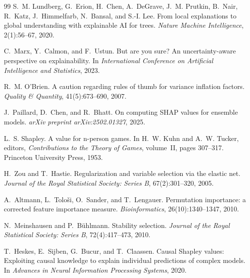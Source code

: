 \documentclass[11pt]{article}
\begin{document}
\begin{thebibliography}{99}
S.~M. Lundberg, G.~Erion, H.~Chen, A.~DeGrave, J.~M. Prutkin, B.~Nair,
  R.~Katz, J.~Himmelfarb, N.~Bansal, and S.-I. Lee.
\newblock From local explanations to global understanding with explainable {AI}
  for trees.
\newblock \emph{Nature Machine Intelligence}, 2(1):56--67, 2020.

C.~Marx, Y.~Calmon, and F.~Ustun.
\newblock But are you sure? An uncertainty-aware perspective on explainability.
\newblock In \emph{International Conference on Artificial Intelligence and
  Statistics}, 2023.

R.~M. O'Brien.
\newblock A caution regarding rules of thumb for variance inflation factors.
\newblock \emph{Quality \& Quantity}, 41(5):673--690, 2007.

J.~Paillard, D.~Chen, and R.~Bhatt.
\newblock On computing {SHAP} values for ensemble models.
\newblock \emph{arXiv preprint arXiv:2502.01327}, 2025.

L.~S. Shapley.
\newblock A value for n-person games.
\newblock In H.~W. Kuhn and A.~W. Tucker, editors, \emph{Contributions to the
  Theory of Games}, volume~II, pages 307--317. Princeton University Press, 1953.

H.~Zou and T.~Hastie.
\newblock Regularization and variable selection via the elastic net.
\newblock \emph{Journal of the Royal Statistical Society: Series B},
  67(2):301--320, 2005.

A.~Altmann, L.~Tolo{\v{s}}i, O.~Sander, and T.~Lengauer.
\newblock Permutation importance: a corrected feature importance measure.
\newblock \emph{Bioinformatics}, 26(10):1340--1347, 2010.

N.~Meinshausen and P.~B{\"u}hlmann.
\newblock Stability selection.
\newblock \emph{Journal of the Royal Statistical Society: Series B},
  72(4):417--473, 2010.

T.~Heskes, E.~Sijben, G.~Bucur, and T.~Claassen.
\newblock Causal {S}hapley values: Exploiting causal knowledge to explain
  individual predictions of complex models.
\newblock In \emph{Advances in Neural Information Processing Systems}, 2020.


\end{thebibliography}
\end{document}
